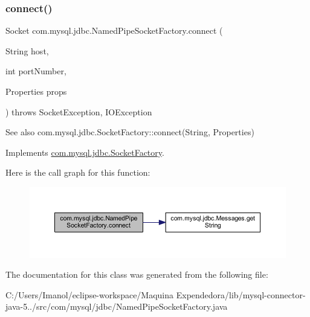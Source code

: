 \subsubsection{\texorpdfstring{connect()}{connect()}}
{\footnotesize\ttfamily Socket com.\+mysql.\+jdbc.\+Named\+Pipe\+Socket\+Factory.\+connect (\begin{DoxyParamCaption}\item[{String}]{host,  }\item[{int}]{port\+Number,  }\item[{Properties}]{props }\end{DoxyParamCaption}) throws Socket\+Exception, I\+O\+Exception}

\begin{DoxySeeAlso}{See also}
com.\+mysql.\+jdbc.\+Socket\+Factory\+::connect(\+String, Properties) 
\end{DoxySeeAlso}


Implements \mbox{\hyperlink{interfacecom_1_1mysql_1_1jdbc_1_1_socket_factory_a2e5061cef1109ab4689437fe177c4ffe}{com.\+mysql.\+jdbc.\+Socket\+Factory}}.

Here is the call graph for this function\+:
\nopagebreak
\begin{figure}[H]
\begin{center}
\leavevmode
\includegraphics[width=350pt]{classcom_1_1mysql_1_1jdbc_1_1_named_pipe_socket_factory_a11fcef05ddc58b721b102fc810d12d5f_cgraph}
\end{center}
\end{figure}


The documentation for this class was generated from the following file\+:\begin{DoxyCompactItemize}
\item 
C\+:/\+Users/\+Imanol/eclipse-\/workspace/\+Maquina Expendedora/lib/mysql-\/connector-\/java-\/5../src/com/mysql/jdbc/Named\+Pipe\+Socket\+Factory.\+java\end{DoxyCompactItemize}
